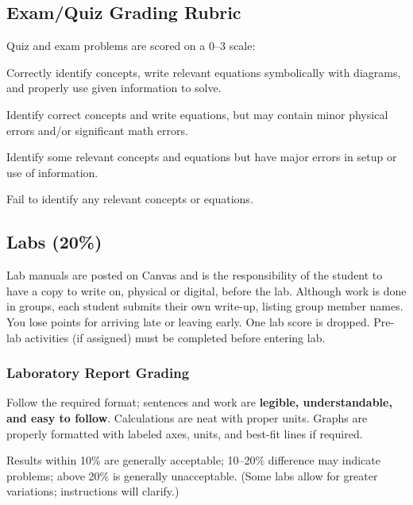 \documentclass[12pt]{article}
\begin{document}
\subsection*{Exam/Quiz Grading Rubric}
Quiz and exam problems are scored on a 0--3 scale:
\begin{description}[leftmargin=1.5em,labelsep=0.5em]
  \item[3] Correctly identify concepts, write relevant equations symbolically with diagrams, and properly use given information to solve.
  \item[2] Identify correct concepts and write equations, but may contain minor physical errors and/or significant math errors.
  \item[1] Identify some relevant concepts and equations but have major errors in setup or use of information.
  \item[0] Fail to identify any relevant concepts or equations.
\end{description}

\subsection*{Labs (20\%)}
Lab manuals are posted on Canvas and is the responsibility of the student to have a copy to write on, physical or digital, before the lab. 
Although work is done in groups, each student submits their own write-up, listing group member names. 
You lose points for arriving late or leaving early. 
One lab score is dropped. 
Pre-lab activities (if assigned) must be completed before entering lab.

\subsubsection*{Laboratory Report Grading}
\begin{description}[leftmargin=1.5em,labelsep=0.5em]
  \item[Presentation: 90\%] Follow the required format; sentences and work are \textbf{legible, understandable, and easy to follow}.
  Calculations are neat with proper units. 
  Graphs are properly formatted with labeled axes, units, and best-fit lines if required.
  \item[Experimental Precision/Accuracy: 10\%] Results within 10\% are generally acceptable; 10--20\% difference may indicate problems; above 20\% is generally unacceptable. (Some labs allow for greater variations; instructions will clarify.)
\end{description}
\end{document}
